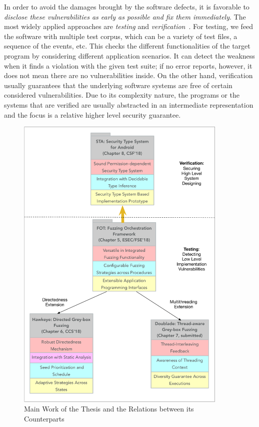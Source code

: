 In order to avoid the damages brought by the software defects, it is favorable to \emph{disclose these vulnerabilities as early as possible and fix them immediately}. The most widely applied approaches are \emph{testing} and \emph{verification}~\cite{Hailpern:2002:SDT:1660992.1660994,Felderer:2016:MST:2904681.2904685,mc-at}. For testing, we feed the software with multiple test corpus, which can be a variety of test files, a sequence of the events, etc. This checks the different functionalities of the target program by considering different application scenarios. It can detect the weakness when it finds a violation with the given test suite; if no error reports, however, it does not mean there are no vulnerabilities inside. On the other hand, verification usually guarantees that the underlying software systems are free of certain considered vulnerabilities. Due to its complexity nature, the programs or the systems that are verified are usually abstracted in an intermediate representation and the focus is a relative higher level security guarantee.

\begin{figure}[ht]
	\begin{center}
		\includegraphics[width=0.9\textwidth]{res/contributions}
		\caption{Main Work of the Thesis and the Relations between its Counterparts}
		\label{fig:works}
	\end{center}
\end{figure}



